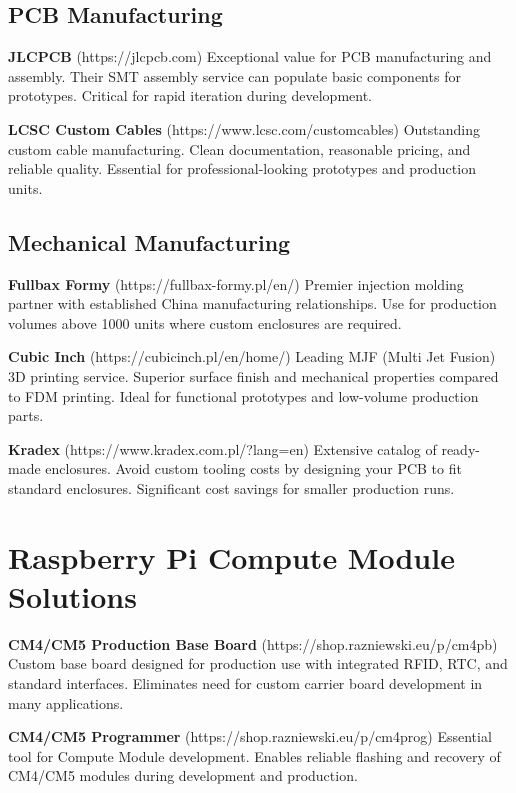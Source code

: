 \subsection{PCB Manufacturing}

\textbf{JLCPCB} (https://jlcpcb.com)
Exceptional value for PCB manufacturing and assembly. Their SMT assembly service can populate basic components for prototypes. Critical for rapid iteration during development.

\textbf{LCSC Custom Cables} (https://www.lcsc.com/customcables)
Outstanding custom cable manufacturing. Clean documentation, reasonable pricing, and reliable quality. Essential for professional-looking prototypes and production units.

\subsection{Mechanical Manufacturing}

\textbf{Fullbax Formy} (https://fullbax-formy.pl/en/)
Premier injection molding partner with established China manufacturing relationships. Use for production volumes above 1000 units where custom enclosures are required.

\textbf{Cubic Inch} (https://cubicinch.pl/en/home/)
Leading MJF (Multi Jet Fusion) 3D printing service. Superior surface finish and mechanical properties compared to FDM printing. Ideal for functional prototypes and low-volume production parts.

\textbf{Kradex} (https://www.kradex.com.pl/?lang=en)
Extensive catalog of ready-made enclosures. Avoid custom tooling costs by designing your PCB to fit standard enclosures. Significant cost savings for smaller production runs.

\section{Raspberry Pi Compute Module Solutions}

\textbf{CM4/CM5 Production Base Board} (https://shop.razniewski.eu/p/cm4pb)
Custom base board designed for production use with integrated RFID, RTC, and standard interfaces. Eliminates need for custom carrier board development in many applications.

\textbf{CM4/CM5 Programmer} (https://shop.razniewski.eu/p/cm4prog)
Essential tool for Compute Module development. Enables reliable flashing and recovery of CM4/CM5 modules during development and production.

